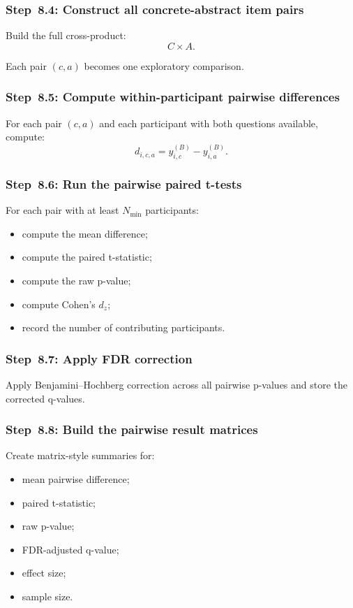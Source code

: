 \documentclass[11pt]{article}
\begin{document}
\subsubsection{Step~8.4: Construct all concrete-abstract item pairs}
Build the full cross-product:
\begin{equation}
C \times A.
\end{equation}

Each pair \((c,a)\) becomes one exploratory comparison.

\subsubsection{Step~8.5: Compute within-participant pairwise differences}
For each pair \((c,a)\) and each participant with both questions available, compute:
\begin{equation}
d_{i,c,a} = y^{(B)}_{i,c} - y^{(B)}_{i,a}.
\end{equation}

\subsubsection{Step~8.6: Run the pairwise paired t-tests}
For each pair with at least \(N_{\min}\) participants:
\begin{itemize}
    \item compute the mean difference;
    \item compute the paired t-statistic;
    \item compute the raw p-value;
    \item compute Cohen's \(d_z\);
    \item record the number of contributing participants.
\end{itemize}

\subsubsection{Step~8.7: Apply FDR correction}
Apply Benjamini--Hochberg correction across all pairwise p-values and store the corrected q-values.

\subsubsection{Step~8.8: Build the pairwise result matrices}
Create matrix-style summaries for:
\begin{itemize}
    \item mean pairwise difference;
    \item paired t-statistic;
    \item raw p-value;
    \item FDR-adjusted q-value;
    \item effect size;
    \item sample size.
\end{itemize}
\end{document}
